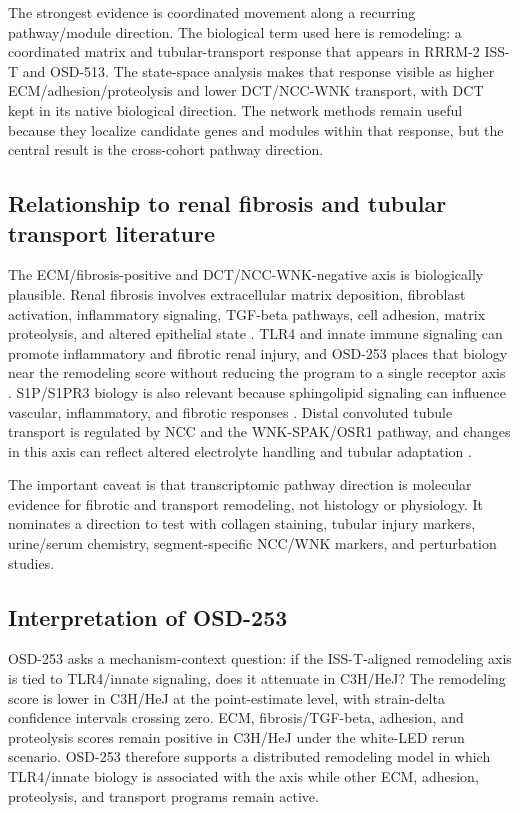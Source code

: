 \documentclass[11pt]{article}
\begin{document}
The strongest evidence is coordinated movement along a recurring pathway/module direction. The biological term used here is remodeling: a coordinated matrix and tubular-transport response that appears in RRRM-2 ISS-T and OSD-513. The state-space analysis makes that response visible as higher ECM/adhesion/proteolysis and lower DCT/NCC-WNK transport, with DCT kept in its native biological direction. The network methods remain useful because they localize candidate genes and modules within that response, but the central result is the cross-cohort pathway direction.

\subsection{Relationship to renal fibrosis and tubular transport literature}

The ECM/fibrosis-positive and DCT/NCC-WNK-negative axis is biologically plausible. Renal fibrosis involves extracellular matrix deposition, fibroblast activation, inflammatory signaling, TGF-beta pathways, cell adhesion, matrix proteolysis, and altered epithelial state \citep{liu2011fibrosis,natneph2024fibrosis,jci2024fibrosis,chavula2022cadherin}. TLR4 and innate immune signaling can promote inflammatory and fibrotic renal injury, and OSD-253 places that biology near the remodeling score without reducing the program to a single receptor axis \citep{souza2015tlr4,carpenter2009tril,carpenter2011tril,wochal2014tril}. S1P/S1PR3 biology is also relevant because sphingolipid signaling can influence vascular, inflammatory, and fibrotic responses \citep{s1p2017,s1p2020,s1p2009}. Distal convoluted tubule transport is regulated by NCC and the WNK-SPAK/OSR1 pathway, and changes in this axis can reflect altered electrolyte handling and tubular adaptation \citep{castaneda2024dct,ge2016wnk}.

The important caveat is that transcriptomic pathway direction is molecular evidence for fibrotic and transport remodeling, not histology or physiology. It nominates a direction to test with collagen staining, tubular injury markers, urine/serum chemistry, segment-specific NCC/WNK markers, and perturbation studies.

\subsection{Interpretation of OSD-253}

OSD-253 asks a mechanism-context question: if the ISS-T-aligned remodeling axis is tied to TLR4/innate signaling, does it attenuate in C3H/HeJ? The remodeling score is lower in C3H/HeJ at the point-estimate level, with strain-delta confidence intervals crossing zero. ECM, fibrosis/TGF-beta, adhesion, and proteolysis scores remain positive in C3H/HeJ under the white-LED rerun scenario. OSD-253 therefore supports a distributed remodeling model in which TLR4/innate biology is associated with the axis while other ECM, adhesion, proteolysis, and transport programs remain active.
\end{document}
